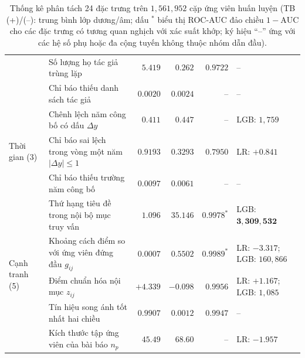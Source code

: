 \begin{table}[htbp]
\begin{tabularx}{\textwidth}{l X r r r l}
            & Số lượng họ tác giả trùng lặp & $5.419$ & $0.262$ & $0.9722$ & -- \\
            & Chỉ báo thiếu danh sách tác giả & $0.0020$ & $0.0024$ & -- & -- \\
        \midrule
        \multirow{3}{*}{Thời gian (3)}
            & Chênh lệch năm công bố có dấu $\Delta y$ & $0.411$ & $0.447$ & -- & LGB: $1{,}759$ \\
            & Chỉ báo sai lệch trong vòng một năm $|\Delta y| \le 1$ & $0.9193$ & $0.3293$ & $0.7950$ & LR: $+0.841$ \\
            & Chỉ báo thiếu trường năm công bố & $0.0097$ & $0.0061$ & -- & -- \\
        \midrule
        \multirow{5}{*}{Cạnh tranh (5)}
            & Thứ hạng tiêu đề trong nội bộ mục truy vấn & $1.096$ & $35.146$ & $0.9978^*$ & LGB: $\mathbf{3{,}309{,}532}$ \\
            & Khoảng cách điểm so với ứng viên đứng đầu $g_{ij}$ & $0.0007$ & $0.5502$ & $\mathbf{0.9989^*}$ & LR: $\mathbf{-3.317}$; LGB: $160{,}866$ \\
            & Điểm chuẩn hóa nội mục $z_{ij}$ & $+4.339$ & $-0.098$ & $0.9956$ & LR: $+1.167$; LGB: $1{,}085$ \\
            & Tín hiệu song ánh tốt nhất hai chiều & $0.9907$ & $0.0012$ & $0.9947$ & -- \\
            & Kích thước tập ứng viên của bài báo $n_p$ & $45.49$ & $68.60$ & -- & LR: $-1.957$ \\
        \bottomrule
    \end{tabularx}
    \caption[Thống kê phân tách 24 đặc trưng trên 1{,}561{,}952 cặp ứng viên huấn luyện]{Thống kê phân tách 24 đặc trưng trên $1{,}561{,}952$ cặp ứng viên huấn luyện (TB (+)/(--): trung bình lớp dương/âm; dấu $^*$ biểu thị ROC-AUC đảo chiều $1 - \text{AUC}$ cho các đặc trưng có tương quan nghịch với xác suất khớp; ký hiệu ``--'' ứng với các hệ số phụ hoặc đa cộng tuyến không thuộc nhóm dẫn đầu).}
    \label{tab:m3_features}
\end{table}

